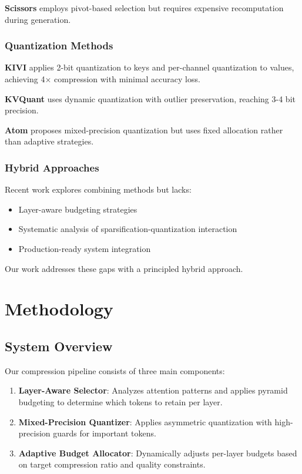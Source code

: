 \documentclass{article}
\begin{document}
\textbf{Scissors} employs pivot-based selection but requires expensive recomputation during generation.

\subsubsection{Quantization Methods}

\textbf{KIVI} applies 2-bit quantization to keys and per-channel quantization to values, achieving 4$\times$ compression with minimal accuracy loss.

\textbf{KVQuant} uses dynamic quantization with outlier preservation, reaching 3-4 bit precision.

\textbf{Atom} proposes mixed-precision quantization but uses fixed allocation rather than adaptive strategies.

\subsubsection{Hybrid Approaches}

Recent work explores combining methods but lacks:
\begin{itemize}
\item Layer-aware budgeting strategies
\item Systematic analysis of sparsification-quantization interaction
\item Production-ready system integration
\end{itemize}

Our work addresses these gaps with a principled hybrid approach.

\section{Methodology}

\subsection{System Overview}

Our compression pipeline consists of three main components:

\begin{enumerate}
\item \textbf{Layer-Aware Selector}: Analyzes attention patterns and applies pyramid budgeting to determine which tokens to retain per layer.
\item \textbf{Mixed-Precision Quantizer}: Applies asymmetric quantization with high-precision guards for important tokens.
\item \textbf{Adaptive Budget Allocator}: Dynamically adjusts per-layer budgets based on target compression ratio and quality constraints.
\end{enumerate}
\end{document}
